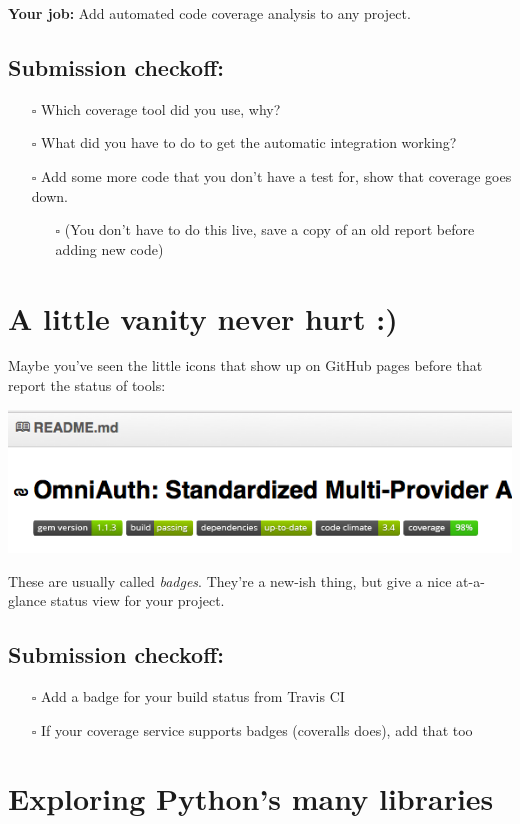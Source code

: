 \documentclass{article}
\begin{document}
\textbf{Your job:} Add automated code coverage analysis to any project.

\subsection*{Submission checkoff:}
\begin{itemize}
  \item[$\square$] Which coverage tool did you use, why?
  \item[$\square$] What did you have to do to get the automatic integration
    working?
  \item[$\square$] Add some more code that you don't have a test for, show
    that coverage goes down.
    \begin{itemize}
      \item[$\square$] (You don't have to do this live, save a copy of an
        old report before adding new code)
    \end{itemize}
\end{itemize}

\section{A little vanity never hurt :)}

Maybe you've seen the little icons that show up on GitHub pages before that
report the status of tools:

\includegraphics[width=.5\linewidth]{badges.png}

These are usually called \emph{badges}. They're a new-ish thing, but give a
nice at-a-glance status view for your project.

\subsection*{Submission checkoff:}
\begin{itemize}
  \item[$\square$] Add a badge for your build status from Travis CI
  \item[$\square$] If your coverage service supports badges (coveralls does),
    add that too
\end{itemize}


\section{Exploring Python's many libraries}
\end{document}
